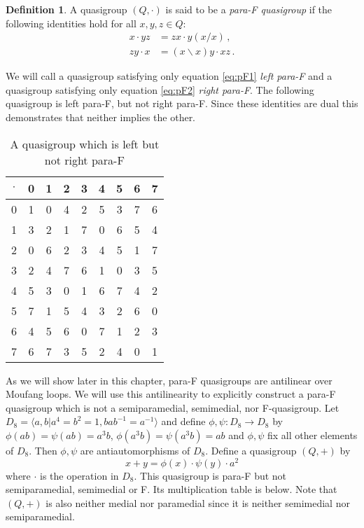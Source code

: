 \documentclass[12pt]{report}
\theoremstyle{definition}
\newtheorem{dfn}[thm]{Definition}
\newcommand{\ldv}{\backslash}       %
\newcommand{\rdv}{/}                %
\begin{document}
\begin{dfn}
  A quasigroup $(Q,\cdot)$ is said to be a \emph{para-F quasigroup} if the following identities
    hold for all $x,y,z\in Q$:
  \begin{align}
    x\cdot yz &= zx\cdot y(x\rdv x)\,,  \label{eq:pF1}  \tag{P1} \\
    zy\cdot x &= (x\ldv x)y\cdot xz\,.  \label{eq:pF2}  \tag{P2}
  \end{align}
\end{dfn}

We will call a quasigroup satisfying only equation \ref{eq:pF1} \emph{left para-F} and a quasigroup
  satisfying only equation \ref{eq:pF2} \emph{right para-F}. The following quasigroup is left para-F,
  but not right para-F. Since these identities are dual this demonstrates that neither implies the other.

\begin{table}[H]
  \centering
  \begin{tabular}{c | c c c c c c c c}
    $\cdot$ & 0 & 1 & 2 & 3 & 4 & 5 & 6 & 7 \\
    \hline \hline
    0 & 1& 0& 4& 2& 5& 3& 7& 6\\
	  1 & 3& 2& 1& 7& 0& 6& 5& 4\\
	  2 & 0& 6& 2& 3& 4& 5& 1& 7\\
	  3 & 2& 4& 7& 6& 1& 0& 3& 5\\
	  4 & 5& 3& 0& 1& 6& 7& 4& 2\\
	  5 & 7& 1& 5& 4& 3& 2& 6& 0\\
	  6 & 4& 5& 6& 0& 7& 1& 2& 3\\
	  7 & 6& 7& 3& 5& 2& 4& 0& 1
  \end{tabular}
  \caption{A quasigroup which is left but not right para-F}
\end{table}

As we will show later in this chapter, para-F quasigroups are antilinear over Moufang loops. We will
  use this antilinearity to explicitly construct a para-F quasigroup which is not a semiparamedial,
  semimedial, nor F-quasigroup. Let $D_8 = \langle a, b | a^4 = b^2 = 1, bab^{-1} = a^{-1}\rangle$
  and define $\phi, \psi : D_8\to D_8$ by 
  $\phi(ab) = \psi(ab) = a^3 b$, $\phi(a^3 b) = \psi(a^3 b) = ab$ and $\phi, \psi$ fix all other
  elements of $D_8$. Then $\phi, \psi$ are antiautomorphisms of $D_8$. Define a quasigroup $(Q, +)$ by
\[x + y = \phi(x) \cdot \psi(y) \cdot a^2\]
where $\cdot$ is the operation in $D_8$. This quasigroup is para-F but not semiparamedial, semimedial or F.
  Its multiplication table is below. Note that $(Q, +)$ is also neither medial nor paramedial since it is
  neither semimedial nor semiparamedial.
\end{document}
